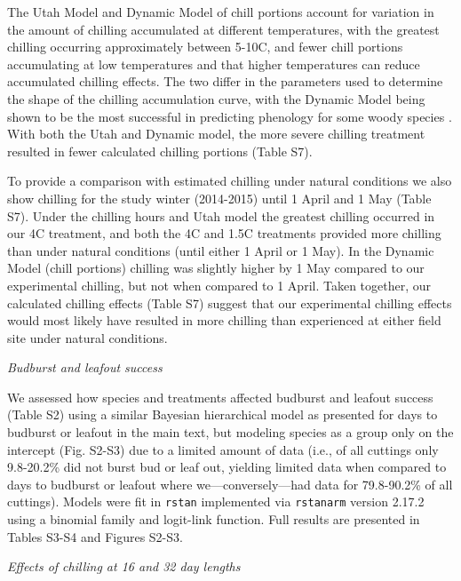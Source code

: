 \documentclass{article}
\begin{document}
\noindent The Utah Model and Dynamic Model of chill portions account for variation in the amount of chilling accumulated at different temperatures, with the greatest chilling occurring approximately between 5-10\degree C, and fewer chill portions accumulating at low temperatures and that higher temperatures can reduce accumulated chilling effects. The two differ in the parameters used to determine the shape of the chilling accumulation curve, with the Dynamic Model being shown to be the most successful in predicting phenology for some woody species \citep{Luedeling:2009}. With both the Utah and Dynamic model, the more severe chilling treatment resulted in fewer calculated chilling portions (Table S7). 

\noindent To provide a comparison with estimated chilling under natural conditions we also show chilling for the study winter (2014-2015) until 1 April and 1 May (Table S7). Under the chilling hours and Utah model the greatest chilling occurred in our 4\degree C treatment, and both the 4\degree C and 1.5\degree C treatments provided more chilling than under natural conditions (until either 1 April or 1 May). In the Dynamic Model (chill portions) chilling was slightly higher by 1 May compared to our experimental chilling, but not when compared to 1 April. Taken together, our calculated chilling effects (Table S7) suggest that our experimental chilling effects would most likely have resulted in more chilling than experienced at either field site under natural conditions. 

\noindent\emph{Budburst and leafout success}

\noindent We assessed how species and treatments affected budburst and leafout success (Table S2) using a similar Bayesian hierarchical model as presented for days to budburst or leafout in the main text, but modeling species as a group only on the intercept (Fig. S2-S3) due to a limited amount of data (i.e., of all cuttings only 9.8-20.2\% did not burst bud or leaf out, yielding limited data when compared to days to budburst or leafout where we---conversely---had data for 79.8-90.2\% of all cuttings). Models were fit in \verb|rstan| implemented via  \verb|rstanarm| version 2.17.2 using a binomial family and logit-link function. Full results are presented in Tables S3-S4 and Figures S2-S3.

\noindent\emph{Effects of chilling at 16 and 32 day lengths}
\end{document}
